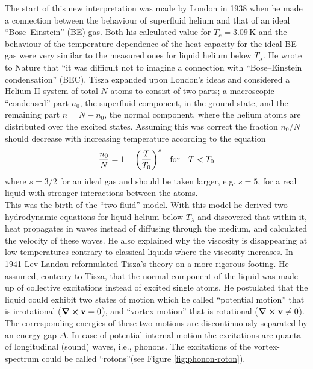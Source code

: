 \documentclass[12pt,a4paper,twosides]{book}
\renewcommand{\vec}[1]{\bm{\mathrm{#1}}}
\newcommand{\unit}[1]{\,\mathrm{#1}}
\begin{document}
		The start of this new interpretation was made by London\citep{London1938} in 1938 when he made a connection between the behaviour of superfluid helium and that of an ideal ``Bose--Einstein'' (BE) gas. Both his calculated value for $T_c=3.09\unit{K}$ and the behaviour of the temperature dependence of the heat capacity for the ideal BE-gas were very similar to the measured ones for liquid helium below $T_\lambda$. He wrote to Nature that ``it was difficult not to imagine a connection with ``Bose--Einstein condensation'' (BEC). Tisza expanded upon London's ideas\citep{Tisza1938} and considered a Helium II system of total $N$ atoms to consist of two parts; a macroscopic ``condensed'' part $n_0$, the superfluid component, in the ground state, and the remaining part $n=N-n_0$, the normal component, where the helium atoms are distributed over the excited states. Assuming this was correct the fraction $n_0/N$ should decrease with increasing temperature according to the equation\\
		\begin{align}
			\frac{n_0}{N} = 1-\qty(\frac{T}{T_0})^s \quad \text{for} \quad T<T_0
		\end{align}
		where $s=3/2$ for an ideal gas and should be taken larger, e.g. $s=5$, for a real liquid with stronger interactions between the atoms.\\
		
		This was the birth of the ``two-fluid'' model. With this model he derived two hydrodynamic equations for liquid helium below $T_\lambda$ and discovered that within it, heat propagates in waves instead of diffusing through the medium, and calculated the velocity of these waves. He also explained why the viscosity is disappearing at low temperatures contrary to classical liquids where the viscosity increases\citep{Tisza1938-1,Tisza1938-2,Tisza1940-1,Tisza1940-2}. In 1941 Lev Landau reformulated Tisza's theory on a more rigorous footing\citep{Landau1941}. He assumed, contrary to Tisza, that the normal component of the liquid was made-up of collective excitations instead of excited single atoms. He postulated that the liquid could exhibit two states of motion which he called ``potential motion'' that is irrotational ($\curl{\vec{v}}=0$), and ``vortex motion'' that is rotational ($\curl{\vec{v}} \neq 0$). The corresponding energies of these two motions are discontinuously separated by an energy gap $\Delta$. In case of potential internal motion  the excitations are quanta of longitudinal (sound) waves, i.e., phonons. The excitations of the vortex-spectrum could be called ``rotons''(see Figure \ref{fig:phonon-roton}).\\
\end{document}
